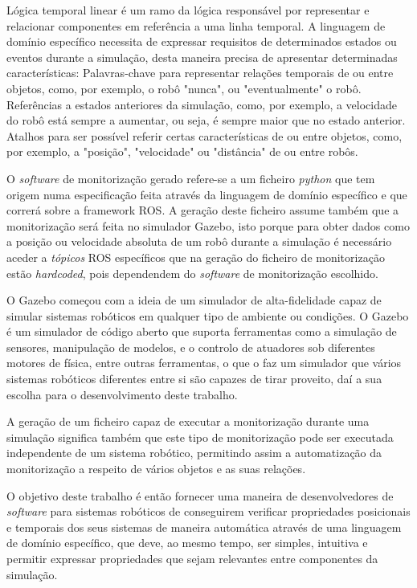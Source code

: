 Lógica temporal linear é um ramo da lógica responsável por representar e relacionar componentes em referência a uma linha temporal. A linguagem de domínio específico necessita de expressar requisitos de determinados estados ou eventos durante a simulação, desta maneira precisa de apresentar determinadas características: Palavras-chave para representar relações temporais de ou entre objetos, como, por exemplo, o robô "nunca", ou "eventualmente" o robô. Referências a estados anteriores da simulação, como, por exemplo, a velocidade do robô está sempre a aumentar, ou seja, é sempre maior que no estado anterior. Atalhos para ser possível referir certas características de ou entre objetos, como, por exemplo, a "posição", "velocidade" ou "distância" de ou entre robôs.

O \textit{software} de monitorização gerado refere-se a um ficheiro \textit{python} que tem origem numa especificação feita através da linguagem de domínio específico e que correrá sobre a framework ROS. A geração deste ficheiro assume também que a monitorização será feita no simulador Gazebo, isto porque para obter dados como a posição ou velocidade absoluta de um robô durante a simulação é necessário aceder a \textit{tópicos} ROS específicos que na geração do ficheiro de monitorização estão \textit{hardcoded}, pois dependendem do \textit{software} de monitorização escolhido. 

O Gazebo começou com a ideia de um simulador de alta-fidelidade capaz de simular sistemas robóticos em qualquer tipo de ambiente ou condições. O Gazebo é um simulador de código aberto que suporta ferramentas como a simulação de sensores, manipulação de modelos, e o controlo de atuadores sob diferentes motores de física, entre outras ferramentas, o que o faz um simulador que vários sistemas robóticos diferentes entre si são capazes de tirar proveito, daí a sua escolha para o desenvolvimento deste trabalho.

A geração de um ficheiro capaz de executar a monitorização durante uma simulação significa também que este tipo de monitorização pode ser executada independente de um sistema robótico, permitindo assim a automatização da monitorização a respeito de vários objetos e as suas relações.

O objetivo deste trabalho é então fornecer uma maneira de desenvolvedores de \textit{software} para sistemas robóticos de conseguirem verificar propriedades posicionais e temporais dos seus sistemas de maneira automática através de uma linguagem de domínio específico, que deve, ao mesmo tempo, ser simples, intuitiva e permitir expressar propriedades que sejam relevantes entre componentes da simulação.

